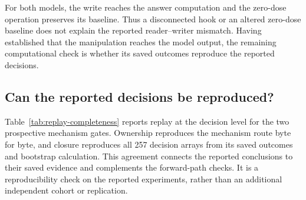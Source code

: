 \begin{table}[H]
\centering
\caption{Forward-path intervention checks.}
\label{tab:hook-witnesses}
\end{table}

For both models, the write reaches the answer computation and the
zero-dose operation preserves its baseline. Thus a disconnected hook or
an altered zero-dose baseline does not explain the reported reader--writer
mismatch. Having established that the manipulation reaches the model
output, the remaining computational check is whether its saved outcomes
reproduce the reported decisions.

\subsection{Can the reported decisions be reproduced?}

Table~\ref{tab:replay-completeness} reports replay at the decision level for
the two prospective mechanism gates. Ownership reproduces the mechanism
route byte for byte, and closure reproduces all 257 decision arrays from
its saved outcomes and bootstrap calculation. This agreement connects
the reported conclusions to their saved evidence and complements the
forward-path checks. It is a reproducibility check on the reported
experiments, rather than an additional independent cohort or replication.

\begin{table}[H]
\centering
\caption{Reproducibility of prospective mechanism decisions.}
\label{tab:replay-completeness}
\end{table}

